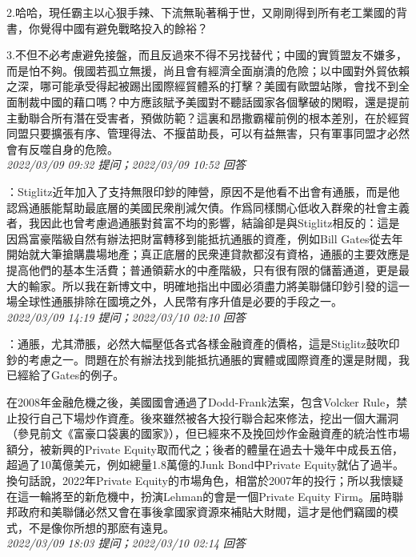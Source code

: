 \documentclass[twocolumn]{ctexart}
\begin{document}
2.哈哈，現任霸主以心狠手辣、下流無恥著稱于世，又剛剛得到所有老工業國的背書，你覺得中國有避免戰略投入的餘裕？

3.不但不必考慮避免接盤，而且反過來不得不另找替代；中國的實質盟友不嫌多，而是怕不夠。俄國若孤立無援，尚且會有經濟全面崩潰的危險；以中國對外貿依賴之深，哪可能承受得起被踢出國際經貿體系的打擊？美國有歐盟站隊，會找不到全面制裁中國的藉口嗎？中方應該賦予美國對不聽話國家各個擊破的閑暇，還是提前主動聯合所有潛在受害者，預做防範？這裏和昂撒霸權前例的根本差別，在於經貿同盟只要擴張有序、管理得法、不揠苗助長，可以有益無害，只有軍事同盟才必然會有反噬自身的危險。
\\

\textit{\hfill\noindent\small 2022/03/09 09:32 提问；2022/03/09 10:52 回答}

：Stiglitz近年加入了支持無限印鈔的陣營，原因不是他看不出會有通脹，而是他認爲通脹能幫助最底層的美國民衆削減欠債。作爲同樣關心低收入群衆的社會主義者，我因此也曾考慮過通脹對貧富不均的影響，結論卻是與Stiglitz相反的：這是因爲富豪階級自然有辦法把財富轉移到能抵抗通脹的資產，例如Bill Gates從去年開始就大筆搶購農場地產；真正底層的民衆連貸款都沒有資格，通脹的主要效應是提高他們的基本生活費；普通領薪水的中產階級，只有很有限的儲蓄通道，更是最大的輸家。所以我在新博文中，明確地指出中國必須盡力將美聯儲印鈔引發的這一場全球性通脹排除在國境之外，人民幣有序升值是必要的手段之一。
\\

\textit{\hfill\noindent\small 2022/03/09 14:19 提问；2022/03/10 02:10 回答}

：通脹，尤其滯脹，必然大幅壓低各式各樣金融資產的價格，這是Stiglitz鼓吹印鈔的考慮之一。問題在於有辦法找到能抵抗通脹的實體或國際資產的還是財閥，我已經給了Gates的例子。

在2008年金融危機之後，美國國會通過了Dodd-Frank法案，包含Volcker Rule，禁止投行自己下場炒作資產。後來雖然被各大投行聯合起來修法，挖出一個大漏洞（參見前文《富豪口袋裏的國家》），但已經來不及挽回炒作金融資產的統治性市場額分，被新興的Private Equity取而代之；後者的體量在過去十幾年中成長五倍，超過了10萬億美元，例如總量1.8萬億的Junk Bond中Private Equity就佔了過半。換句話說，2022年Private Equity的市場角色，相當於2007年的投行；所以我懷疑在這一輪將至的新危機中，扮演Lehman的會是一個Private Equity Firm。届時聯邦政府和美聯儲必然又會在事後拿國家資源來補貼大財閥，這才是他們竊國的模式，不是像你所想的那麽有遠見。
\\

\textit{\hfill\noindent\small 2022/03/09 18:03 提问；2022/03/10 02:14 回答}
\end{document}
